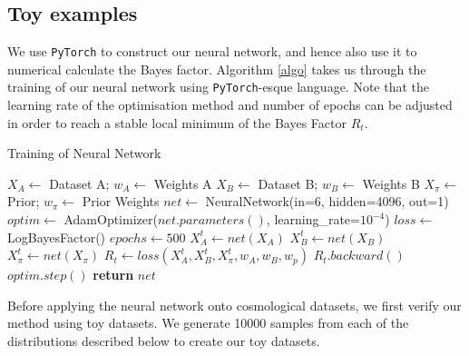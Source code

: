 \documentclass[%
 reprint,
 amsmath,amssymb,
 aps,
]{revtex4-2}
\begin{document}


\subsection{Toy examples}

We use \texttt{PyTorch} to construct our neural network, and hence also use it to numerical calculate the Bayes factor. Algorithm \ref{algo} takes us through the training of our neural network using \texttt{PyTorch}-esque language. Note that the learning rate of the optimisation method and number of epochs can be adjusted in order to reach a stable local minimum of the Bayes Factor $R_t$.
\begin{algorithm}[H]
\caption{Training of Neural Network}\label{algo}
    \begin{algorithmic}[1]
    \State $X_A \gets $ Dataset A; $w_A \gets $ Weights A 
    \State $X_B \gets $ Dataset B; $w_B \gets $ Weights B
    \State $X_\pi \gets $ Prior; $w_\pi \gets $ Prior Weights
    \State
    \State $net \gets $ NeuralNetwork(in=6, hidden=4096, out=1)
    \State $optim \gets $ AdamOptimizer($net.parameters()$, learning\_rate=$10^{-4}$)
    \State $loss \gets $ LogBayesFactor()
    \State $epochs \gets 500$
    \State
        \State $X_A^t \gets net(X_A)$ 
        \State $X_B^t \gets net(X_B)$
        \State $X_\pi^t \gets net(X_\pi)$
        \State
        \State $R_t \gets loss(X_A^t, X_B^t, X_\pi^t, w_A, w_B, w_p)$
        \State $R_t.backward()$ 
        \State $optim.step()$ 
    \EndFor
    \State
    \State \textbf{return} $net$
    \end{algorithmic}
\end{algorithm}

Before applying the neural network onto cosmological datasets, we first verify our method using toy datasets. We generate 10000 samples from each of the distributions described below to create our toy datasets.
\end{document}
